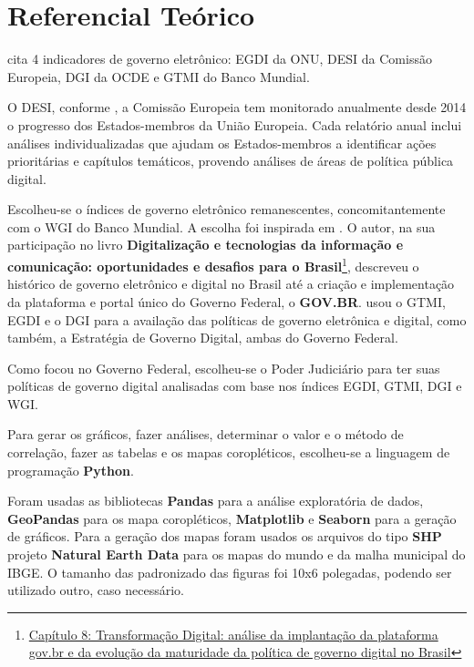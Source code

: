 \chapter{Referencial Teórico}

\cite{martinez2022egovernment} cita 4 indicadores de governo eletrônico: EGDI da ONU, DESI da Comissão Europeia, DGI da OCDE e GTMI do Banco Mundial.

O DESI, conforme \cite{desi_2022}, a Comissão Europeia tem monitorado anualmente desde 2014 o progresso dos Estados-membros da União Europeia. Cada relatório anual inclui análises individualizadas que ajudam os Estados-membros a identificar ações prioritárias e capítulos temáticos, provendo análises de áreas de política pública digital.

Escolheu-se o índices de governo eletrônico remanescentes, concomitantemente com o WGI do Banco Mundial. A escolha foi inspirada em \cite{mitkiewicz2024transformaccao}. O autor, na sua participação no livro \textbf{Digitalização e tecnologias da informação e comunicação: oportunidades e desafios para o Brasil}\footnote{\href{http://dx.doi.org/10.38116/9786556350660cap8}{Capítulo 8: Transformação Digital: análise da implantação da plataforma gov.br e da evolução da maturidade da política de governo digital no Brasil}}, descreveu o histórico de governo eletrônico e digital no Brasil até a criação e implementação da plataforma e portal único do Governo Federal, o \textbf{GOV.BR}. \cite{mitkiewicz2024transformaccao} usou o GTMI, EGDI e o DGI para a availação das políticas de governo eletrônica e digital, como também, a Estratégia de Governo Digital, ambas do Governo Federal.

Como \cite{mitkiewicz2024transformaccao} focou no Governo Federal, escolheu-se o Poder Judiciário para ter suas políticas de governo digital analisadas com base nos índices EGDI, GTMI, DGI e WGI.

Para gerar os gráficos, fazer análises, determinar o valor e o método de correlação, fazer as tabelas e os mapas coropléticos, escolheu-se a linguagem de programação \textbf{Python}.

Foram usadas as bibliotecas \textbf{Pandas} para a análise exploratória de dados, \textbf{GeoPandas} para os mapa coropléticos, \textbf{Matplotlib} e \textbf{Seaborn} para a geração  de gráficos. Para a geração dos mapas foram usados os arquivos do tipo \textbf{SHP} projeto \textbf{Natural Earth Data} para os mapas do mundo e da malha municipal do IBGE. O tamanho das padronizado das figuras foi 10x6 polegadas, podendo ser utilizado outro, caso necessário.

